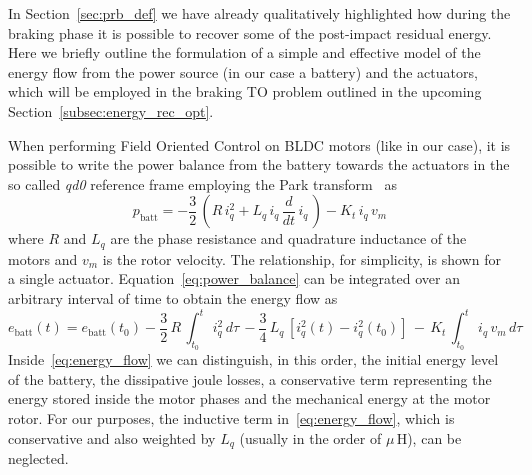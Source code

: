 In Section~\ref{sec:prb_def} we have already qualitatively highlighted how during the braking phase it is possible to recover some of the post-impact residual energy. Here we briefly outline the formulation of a simple and effective model of the energy flow from the power source (in our case a battery) and the actuators, which will be employed in the braking TO problem outlined in the upcoming Section~\ref{subsec:energy_rec_opt}. 

When performing Field Oriented Control on BLDC motors (like in our case), it is possible to write the power balance from the battery towards the actuators in the so called \textit{qd0} reference frame employing the Park transform~\cite{foc::krause2013analysis} as 
\begin{equation}\label{eq:power_balance}
    p_{\mathrm{batt}} = - \dfrac{3}{2}\,\left(R\,i_{q}^2 + L_q\,i_{q}\,\dfrac{d}{dt}\,i_q\,\right) - K_t\,i_q\,v_m
\end{equation}
where $R$ and $L_q$ are the phase resistance and quadrature inductance of the motors and $v_m$ is the rotor velocity. The relationship, for simplicity, is shown for a single actuator. Equation~\eqref{eq:power_balance} can be integrated over an arbitrary interval of time to obtain the energy flow as
\begin{dmath} \label{eq:energy_flow}
e_{\mathrm{batt}}(t) = e_{\mathrm{batt}}(t_0)- \dfrac{3}{2}\,R\,\int_{t_0}^{t}\,i_{q}^2\,d\tau\,- \dfrac{3}{4}\,L_q\,\left[i_q^2(t) - i_q^2(t_0)\right]\,-\,K_t\,\int_{t_0}^{t}\,i_q\,v_{m}\,d\tau
\end{dmath}\vspace{-0.2cm}
Inside~\eqref{eq:energy_flow} we can distinguish, in this order, the initial energy level of the battery, the dissipative joule losses, a conservative term representing the energy stored inside the motor phases and the mechanical energy at the motor rotor. For our purposes, the inductive term in~\eqref{eq:energy_flow}, which is conservative and also weighted by $L_q$ (usually in the order of $\mu\,\mathrm{H}$), can be neglected. 

